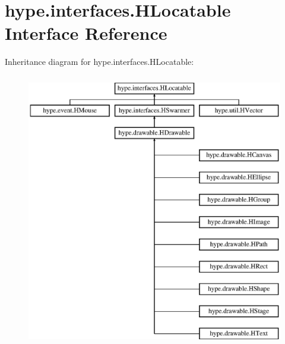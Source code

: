 \hypertarget{interfacehype_1_1interfaces_1_1_h_locatable}{\section{hype.\-interfaces.\-H\-Locatable Interface Reference}
\label{interfacehype_1_1interfaces_1_1_h_locatable}
}
Inheritance diagram for hype.\-interfaces.\-H\-Locatable\-:\begin{figure}[H]
\begin{center}
\leavevmode
\includegraphics[height=12.000000cm]{interfacehype_1_1interfaces_1_1_h_locatable}
\end{center}
\end{figure}
